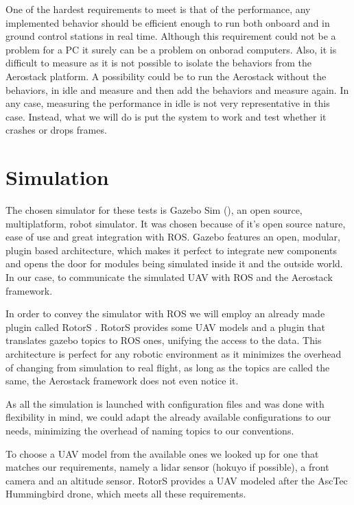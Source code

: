   One of the hardest requirements to meet is that of the performance, any implemented behavior should be efficient enough to run both onboard and in ground control stations in real time. Although this requirement could not be a problem for a PC it surely can be a problem on onborad computers. Also, it is difficult to measure as it is not possible to isolate the behaviors from the Aerostack platform. A possibility could be to run the Aerostack without the behaviors, in idle and measure and then add the behaviors and measure again. In any case, measuring the performance in idle is not very representative in this case. Instead, what we will do is put the system to work and test whether it crashes or drops frames.

\section{Simulation} \label{ch_5:sect:simulation}

  The chosen simulator for these tests is Gazebo Sim (\cite{gazebo_web}), an open source, multiplatform, robot simulator. It was chosen because of it's open source nature, ease of use and great integration with ROS. Gazebo features an open, modular, plugin based architecture, which makes it perfect to integrate new components and opens the door for modules being simulated inside it and the outside world. In our case, to communicate the simulated UAV with ROS and the Aerostack framework.

  In order to convey the simulator with ROS we will employ an already made plugin called RotorS \cite{rotors2016}. RotorS provides some UAV models and a plugin that translates gazebo topics to ROS ones, unifying the access to the data. This architecture is perfect for any robotic environment as it minimizes the overhead of changing from simulation to real flight, as long as the topics are called the same, the Aerostack framework does not even notice it.

  As all the simulation is launched with configuration files and was done with flexibility in mind, we could adapt the already available configurations to our needs, minimizing the overhead of naming topics to our conventions.

  To choose a UAV model from the available ones we looked up for one that matches our requirements, namely a lidar sensor (hokuyo if possible), a front camera and an altitude sensor. RotorS provides a UAV modeled after the AscTec Hummingbird \cite{hummingbird_web} drone, which meets all these requirements.


